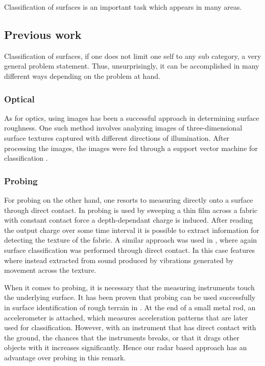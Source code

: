 Classification of surfaces is an important task which appears in many areas. 

\subsection{Previous work}

Classification of surfaces, if one does not limit one self to any sub category, a very general problem statement. Thus, unsurprisingly, it can be accomplished in many different ways depending on the problem at hand.  

\subsubsection{Optical}
As for optics, using images has been a successful approach in determining surface roughness. One such method involves analyzing images of three-dimensional surface textures captured with different directions of illumination. After processing the images, the images were fed through a support vector machine for classification \citep{dong_duan_yang_2008}. 


\subsubsection{Probing}
For probing on the other hand, one resorts to measuring directly onto a surface through direct contact. In \citep{song_han_hu_li_2014} probing is used by sweeping a thin film across a fabric with constant contact force a depth-dependant charge is induced. After reading the output charge over some time interval it is possible to extract information for detecting the texture of the fabric. A similar approach was used in \citep{strese_schuwerk_iepure_steinbach_2017}, where again surface classification was performed through direct contact. In this case features where instead extracted from sound produced by vibrations generated by movement across the texture. 


When it comes to probing, it is necessary that the measuring instruments touch the underlying surface. It has been proven that probing can be used successfully in surface identification of rough terrain in \citep{giguere_dudek_2011}. At the end of a small metal rod, an accelerometer is attached, which measures acceleration patterns that are later used for classification. However, with an instrument that has direct contact with the ground, the chances that the instruments breaks, or that it drags other objects with it increases significantly. Hence our radar based approach has an advantage over probing in this remark.


